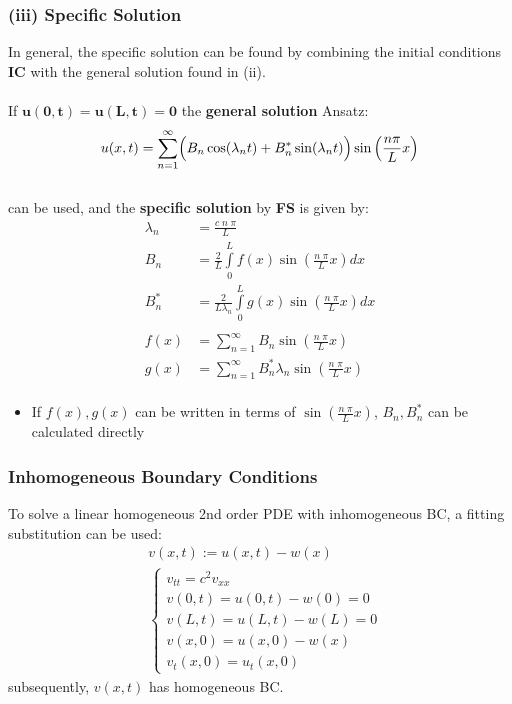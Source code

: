 \subsubsection{(iii) Specific Solution}\label{pde/1dwave/specificSolution}
In general, the specific solution can be found by combining the initial conditions \textbf{IC}
with the general solution found in (ii).\\\hbox{}\\
If $\mathbf{u(0,t)=u(L,t)= 0}$ the \textbf{general solution} Ansatz:
\begin{equation*}
    u(x,t)=\sum\limits_{n=1}^{\infty}
    \Bigl( B_n \cos(\lambda _n t)+B_n^* \sin(\lambda_n t)\Bigr) \sin
    \left(\frac{n \pi}{L}x \right)
\end{equation*}\\
can be used, and the \textbf{specific solution} by \textbf{FS} is given by:
\begin{align*}
    \lambda_n & =\frac{c\; n\; \pi}{L}                                               \\
    B_n       & =\frac{2}{L}\int\limits_0^L f(x)\sin(\frac{n\;\pi}{L}x)dx            \\
    B_n^*     & =\frac{2}{L\lambda_n} \int\limits_0^L g(x) \sin(\frac{n\;\pi}{L}x)dx \\\\
    f(x)      & =\sum\limits_{n=1}^{\infty} B_n \sin(\frac{n\;\pi}{L}x)              \\
    g(x)      & =\sum\limits_{n=1}^{\infty} B_n^* \lambda_n \sin(\frac{n\;\pi}{L}x)  \\
\end{align*}
\begin{itemize}
    \item If $f(x),g(x)$ can be written in terms of $\sin(\frac{n\;\pi}{L}x)$, $B_n, B_n^*$
          can be calculated directly
\end{itemize}

\subsubsection{Inhomogeneous Boundary Conditions}
To solve a linear homogeneous 2nd order PDE with inhomogeneous BC, a fitting substitution can be used:
\begin{align*}
     & v(x,t):= u(x,t) -w(x) \\
     & \begin{cases}
           v_{tt}=c^2v_{xx}     \\
           v(0,t)=u(0,t)-w(0)=0 \\
           v(L,t)=u(L,t)-w(L)=0 \\
           v(x,0)=u(x,0)-w(x)   \\
           v_t(x,0)=u_t(x,0)
       \end{cases}
\end{align*}
subsequently, $v(x,t)$ has homogeneous BC.

